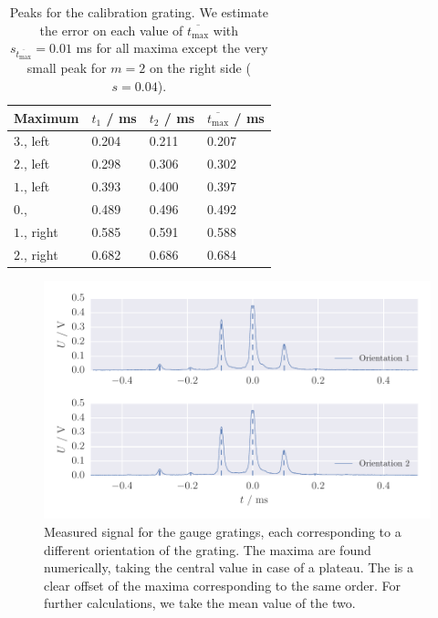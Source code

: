 \renewcommand{\arraystretch}{1.5}
\begin{table}[htdp]
    \centering
    \begin{tabular}{|p{3cm}|p{2cm}|p{2cm}|p{2cm}|}
        \hline
        \rowcolor{tabcolor}
        Maximum & $t_1$ / ms & $t_2$  / ms & $\overline{t_\mathrm{max}}$ / ms \\ \hline
        $3.$, left  & 0.204     & 0.211 & 0.207 \\
        $2.$, left  & 0.298     & 0.306 & 0.302 \\
        $1.$, left  & 0.393     & 0.400 & 0.397 \\
        $0.$,       & 0.489     & 0.496 & 0.492 \\
        $1.$, right & 0.585     & 0.591 & 0.588 \\
        $2.$, right & 0.682     & 0.686 & 0.684 \\
        \hline
    \end{tabular}
    \caption{
        Peaks for the calibration grating. We estimate the error on each 
        value of $\overline{t_\mathrm{max}}$ with 
        $s_{\overline{t_\mathrm{max}}} = 0.01$ ms for all maxima except the 
        very small peak for $m = 2$ on the right side ($s = 0.04$).
        }
    \label{tab:calibrate_peaks}
\end{table}
\begin{figure}[htpb]
    \centering
    \includegraphics[width=1.0\linewidth]{figures/calibrate_peaks}
    \caption{
        Measured signal for the gauge gratings, each corresponding to a different orientation of the 
        grating. The maxima are found numerically, taking the central value in case of a plateau. 
        The is a clear offset of the maxima corresponding to the same order. For further calculations, 
        we take the mean value of the two. 
        }
     \label{fig:calibrate_peaks}
\end{figure}

